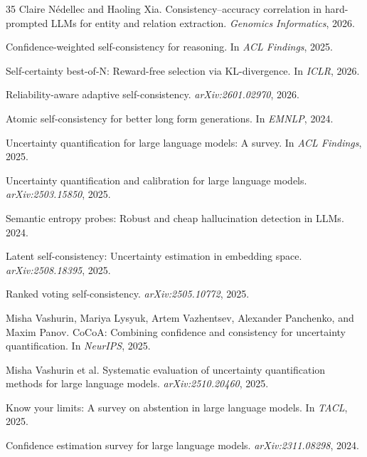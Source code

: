 \documentclass[11pt]{article}
\begin{document}
\begin{thebibliography}{35}
Claire N\'{e}dellec and Haoling Xia.
Consistency--accuracy correlation in hard-prompted {LLM}s for entity and relation extraction.
\emph{Genomics Informatics}, 2026.

Confidence-weighted self-consistency for reasoning.
In \emph{ACL Findings}, 2025.

Self-certainty best-of-{N}: Reward-free selection via {KL}-divergence.
In \emph{ICLR}, 2026.

Reliability-aware adaptive self-consistency.
\emph{arXiv:2601.02970}, 2026.

Atomic self-consistency for better long form generations.
In \emph{EMNLP}, 2024.

Uncertainty quantification for large language models: A survey.
In \emph{ACL Findings}, 2025.

Uncertainty quantification and calibration for large language models.
\emph{arXiv:2503.15850}, 2025.

Semantic entropy probes: Robust and cheap hallucination detection in {LLM}s.
2024.

Latent self-consistency: Uncertainty estimation in embedding space.
\emph{arXiv:2508.18395}, 2025.

Ranked voting self-consistency.
\emph{arXiv:2505.10772}, 2025.

Misha Vashurin, Mariya Lysyuk, Artem Vazhentsev, Alexander Panchenko, and Maxim Panov.
{CoCoA}: Combining confidence and consistency for uncertainty quantification.
In \emph{NeurIPS}, 2025.

Misha Vashurin et al.
Systematic evaluation of uncertainty quantification methods for large language models.
\emph{arXiv:2510.20460}, 2025.

Know your limits: A survey on abstention in large language models.
In \emph{TACL}, 2025.

Confidence estimation survey for large language models.
\emph{arXiv:2311.08298}, 2024.


\end{thebibliography}
\end{document}
